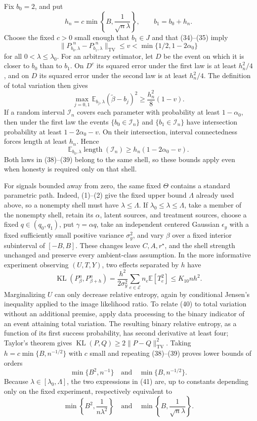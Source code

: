 Fix \(b_0=2\), and put
\[
 h_n=c\min\!\left\{B,\frac{1}{\sqrt n\lambda}\right\},
 \qquad b_1=b_0+h_n. \tag{36}
\]
Choose the fixed \(c>0\) small enough that \(b_1\in J\) and that (34)--(35) imply
\[
 \|P_{b_0,\lambda}^{,n}-P_{b_1,\lambda}^{,n}\|_{\mathrm{TV}}
 \leq v<\min\{1/2,1-2\alpha_0\} \tag{37}
\]
for all \(0<\lambda\leq\lambda_0\).  For an arbitrary estimator, let \(D\) be the event on which it is closer to \(b_0\) than to \(b_1\).  On \(D^c\) its squared error under the first law is at least \(h_n^2/4\), and on \(D\) its squared error under the second law is at least \(h_n^2/4\).  The definition of total variation then gives
\[
 \max_{j=0,1}\mathbb E_{b_j,\lambda}
 (\widetilde\beta-b_j)^2
 \geq\frac{h_n^2}{8}(1-v). \tag{38}
\]
If a random interval \(\mathcal I_n\) covers each parameter with probability at least \(1-\alpha_0\), then under the first law the events \(\{b_0\in\mathcal I_n\}\) and \(\{b_1\in\mathcal I_n\}\) have intersection probability at least \(1-2\alpha_0-v\).  On their intersection, interval connectedness forces length at least \(h_n\).  Hence
\[
 \mathbb E_{b_0,\lambda}\operatorname{length}(\mathcal I_n)
 \geq h_n(1-2\alpha_0-v). \tag{39}
\]
Both laws in (38)--(39) belong to the same shell, so these bounds apply even when honesty is required only on that shell.

For signals bounded away from zero, the same fixed \(\Theta\) contains a standard parametric path.  Indeed, (1)--(2) give the fixed upper bound \(\Lambda\) already used above, so a nonempty shell must have \(\lambda\leq\Lambda\).  If \(\lambda_0\leq\lambda\leq\Lambda\), take a member of the nonempty shell, retain its \(\alpha\), latent sources, and treatment sources, choose a fixed \(q\in(q_0,q_1)\), put \(\gamma=\alpha q\), take an independent centered Gaussian \(\epsilon_y\) with a fixed sufficiently small positive variance \(\sigma_y^2\), and vary \(\beta\) over a fixed interior subinterval of \([-B,B]\).  These changes leave \(C,A,r^\star\), and the shell strength unchanged and preserve every ambient-class assumption.  In the more informative experiment observing \((U,T,Y)\), two effects separated by \(h\) have
\[
 \operatorname{KL}(P_\beta^n,P_{\beta+h}^n)
 =\frac{h^2}{2\sigma_y^2}\sum_{e\in\mathcal E}n_e\mathbb E[T_e^2]
 \leq K_{10}nh^2. \tag{40}
\]
Marginalizing \(U\) can only decrease relative entropy, again by conditional Jensen's inequality applied to the image likelihood ratio.  To relate (40) to total variation without an additional premise, apply data processing to the binary indicator of an event attaining total variation.  The resulting binary relative entropy, as a function of its first success probability, has second derivative at least four; Taylor's theorem gives
\(\operatorname{KL}(P,Q)\geq2\|P-Q\|_{\mathrm{TV}}^2\).  Taking \(h=c\min\{B,n^{-1/2}\}\) with \(c\) small and repeating (38)--(39) proves lower bounds of orders
\[
 \min\{B^2,n^{-1}\}
 \quad\text{and}\quad
 \min\{B,n^{-1/2}\}. \tag{41}
\]
Because \(\lambda\in[\lambda_0,\Lambda]\), the two expressions in (41) are, up to constants depending only on the fixed experiment, respectively equivalent to
\[
 \min\!\left\{B^2,\frac{1}{n\lambda^2}\right\}
 \quad\text{and}\quad
 \min\!\left\{B,\frac{1}{\sqrt n\lambda}\right\}. \tag{42}
\]

